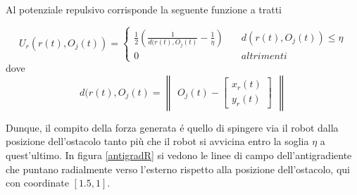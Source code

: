 \documentclass[14pt,a4paper]{extarticle}
\begin{document}
\begin{description}
Al potenziale repulsivo corrisponde la seguente funzione a tratti 

\begin{equation}
\label{potREq}
U_r(r(t),O_j(t)) = 
\begin{cases}
\frac{1}{2} \left( \frac{1}{d(r(t),O_j(t)} - \frac{1}{\eta} \right) \quad &d(r(t),O_j(t)) \leq \eta \\
0 \quad &altrimenti
\end{cases}
\end{equation}
dove \[ d(r(t),O_j(t) = \begin{Vmatrix}O_j(t) - \begin{bmatrix} x_r(t)\\ y_r(t) \end{bmatrix}\end{Vmatrix}\]

Dunque, il compito della forza generata é quello di spingere via il robot dalla posizione dell'ostacolo tanto più che il robot si avvicina entro la soglia \(\eta\) a quest'ultimo. In figura \ref{antigradR} si vedono le linee di campo dell'antigradiente che puntano radialmente verso l'esterno rispetto alla posizione dell'ostacolo, qui con coordinate \([1.5, 1]\).
\end{description}
\end{document}
